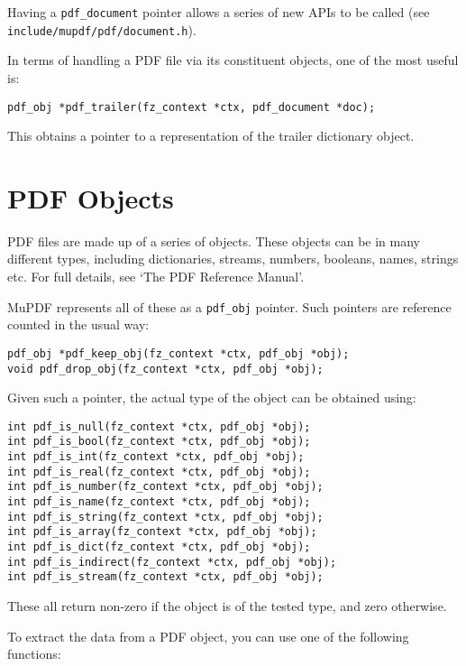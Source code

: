 \documentclass[oneside]{book}
\begin{document}
Having a \texttt{pdf\_document} pointer allows a series of new APIs to be called (see \texttt{include\slash mupdf\slash pdf\slash document.h}).

In terms of handling a PDF file via its constituent objects, one of the most useful is:

\begin{lstlisting}
pdf_obj *pdf_trailer(fz_context *ctx, pdf_document *doc);
\end{lstlisting}

This obtains a pointer to a representation of the trailer dictionary object.

\section{PDF Objects}

PDF files are made up of a series of objects. These objects can be in many different types, including dictionaries, streams, numbers, booleans, names, strings etc. For full details, see `The PDF Reference Manual'.

MuPDF represents all of these as a \texttt{pdf\_obj} pointer. Such pointers are reference counted in the usual way:

\begin{lstlisting}
pdf_obj *pdf_keep_obj(fz_context *ctx, pdf_obj *obj);
void pdf_drop_obj(fz_context *ctx, pdf_obj *obj);
\end{lstlisting}

Given such a pointer, the actual type of the object can be obtained using:

\begin{lstlisting}
int pdf_is_null(fz_context *ctx, pdf_obj *obj);
int pdf_is_bool(fz_context *ctx, pdf_obj *obj);
int pdf_is_int(fz_context *ctx, pdf_obj *obj);
int pdf_is_real(fz_context *ctx, pdf_obj *obj);
int pdf_is_number(fz_context *ctx, pdf_obj *obj);
int pdf_is_name(fz_context *ctx, pdf_obj *obj);
int pdf_is_string(fz_context *ctx, pdf_obj *obj);
int pdf_is_array(fz_context *ctx, pdf_obj *obj);
int pdf_is_dict(fz_context *ctx, pdf_obj *obj);
int pdf_is_indirect(fz_context *ctx, pdf_obj *obj);
int pdf_is_stream(fz_context *ctx, pdf_obj *obj);
\end{lstlisting}

These all return non-zero if the object is of the tested type, and zero otherwise.

To extract the data from a PDF object, you can use one of the following functions:
\end{document}
